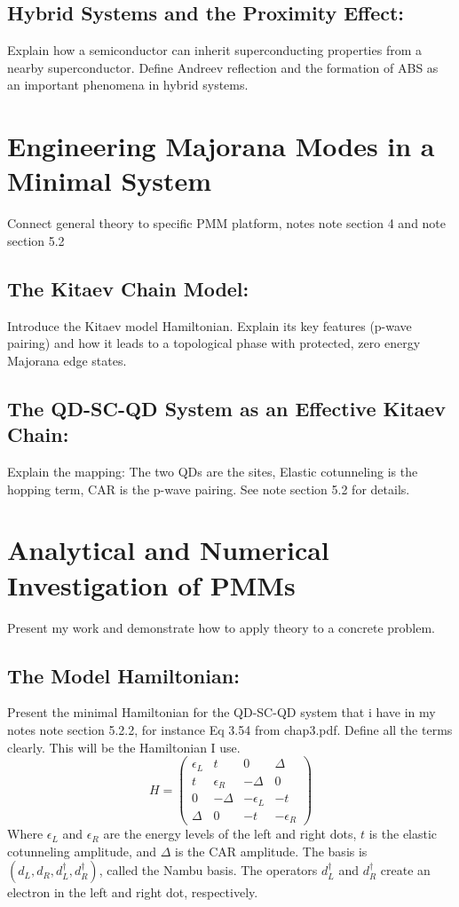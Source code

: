 \documentclass[11pt, letterpaper, titlepage]{article}
\begin{document}
\subsection{Hybrid Systems and the Proximity Effect:} Explain how a semiconductor can inherit superconducting properties from a nearby superconductor. Define Andreev reflection and the formation of ABS as an important phenomena in hybrid systems.\\

\section{Engineering Majorana Modes in a Minimal System}
Connect general theory to specific PMM platform, notes note section 4 and note section 5.2\\
\subsection{The Kitaev Chain Model:} Introduce the Kitaev model Hamiltonian. Explain its key features (p-wave pairing) and how it leads to a topological phase with protected, zero energy Majorana edge states.\\
\subsection{The QD-SC-QD System as an Effective Kitaev Chain:} Explain the mapping: The two QDs are the sites, Elastic cotunneling is the hopping term, CAR is the p-wave pairing. See note section 5.2 for details.\\

\section{Analytical and Numerical Investigation of PMMs}
Present my work and demonstrate how to apply theory to a concrete problem.\\
\subsection{The Model Hamiltonian:} Present the minimal Hamiltonian for the QD-SC-QD system that i have in my notes note section 5.2.2, for instance Eq 3.54 from chap3.pdf. Define all the terms clearly. This will be the Hamiltonian I use.\\

$$  
  H = \begin{pmatrix}
    ϵ_L & t & 0 & Δ \\
    t & ϵ_R & -Δ & 0 \\
    0 & -Δ & -ϵ_L & -t \\
    Δ & 0 & -t & -ϵ_R
  \end{pmatrix}
$$  
Where $ϵ_L$ and $ϵ_R$ are the energy levels of the left and right dots, $t$ is the elastic cotunneling amplitude, and $Δ$ is the CAR amplitude. The basis is $(d_L, d_R, d_L^{†}, d_R^{†})$, called the Nambu basis. The operators $d_L^{†}$ and $d_R^{†}$ create an electron in the left and right dot, respectively.\\
\end{document}

